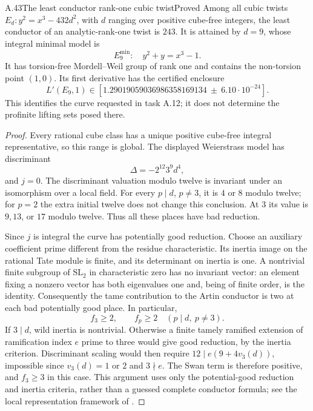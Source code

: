 \begin{statement}{A.43}{The least conductor rank-one cubic twist}{Proved}
Among all cubic twists $E_d:y^2=x^3-432d^2$, with $d$ ranging over
positive cube-free integers, the least conductor of an analytic-rank-one
twist is $243$. It is attained by $d=9$, whose integral minimal model is
\[
 E_9^{\min}:\quad y^2+y=x^3-1.
\]
It has torsion-free Mordell--Weil group of rank one and contains the
non-torsion point $(1,0)$. Its first derivative has the certified enclosure
\[
 L'(E_9,1)\in
 [1.29019059036986358169134\ \mathbin{\pm}\ 6.10\cdot10^{-24}].
\]
This identifies the curve requested in task A.12; it does not determine
the profinite lifting sets posed there.
\end{statement}
\begin{proof}
Every rational cube class has a unique positive cube-free integral
representative, so this range is global. The displayed Weierstrass model
has discriminant
\[
 \Delta=-2^{12}3^9d^4,
\]
and $j=0$. The discriminant valuation modulo twelve is invariant under
an isomorphism over a local field. For every $p\mid d$, $p\ne3$, it is
$4$ or $8$ modulo twelve; for $p=2$ the extra initial twelve does not
change this conclusion. At $3$ its value is $9,13$, or $17$ modulo
twelve. Thus all these places have bad reduction.

Since $j$ is integral the curve has potentially good reduction. Choose
an auxiliary coefficient prime different from the residue
characteristic. Its inertia image on the rational Tate module is finite,
and its determinant on inertia is one. A nontrivial finite subgroup of
$\mathrm{SL}_2$ in characteristic zero has no invariant vector: an
element fixing a nonzero vector has both eigenvalues one and, being of
finite order, is the identity. Consequently the tame contribution to the
Artin conductor is two at each bad potentially good place. In particular,
\[
 f_3\geq2,\qquad f_p\geq2\quad(p\mid d,\ p\ne3).
\]
If $3\mid d$, wild inertia is nontrivial. Otherwise a finite tamely
ramified extension of ramification index $e$ prime to three would give
good reduction, by the inertia criterion. Discriminant scaling would
then require $12\mid e(9+4v_3(d))$, impossible since
$v_3(d)=1$ or $2$ and $3\nmid e$. The Swan term is therefore positive,
and $f_3\geq3$ in this case. This argument uses only the potential-good
reduction and inertia criteria, rather than a guessed complete
conductor formula; see the local representation framework of
\citet{AMSerre1972}.


\end{proof}
